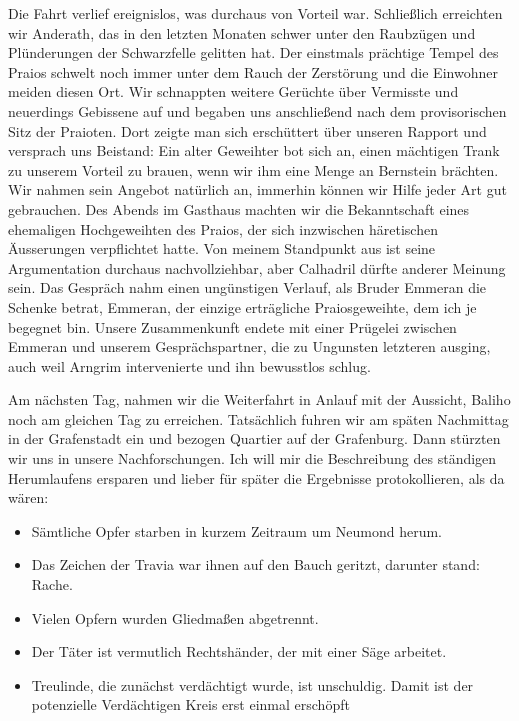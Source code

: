 Die Fahrt verlief ereignislos, was durchaus von Vorteil war. Schließlich erreichten wir Anderath, das in den letzten Monaten schwer unter den Raubzügen und Plünderungen der Schwarzfelle gelitten hat. Der einstmals prächtige Tempel des Praios schwelt noch immer unter dem Rauch der Zerstörung und die Einwohner meiden diesen Ort. Wir schnappten weitere Gerüchte über Vermisste und neuerdings Gebissene auf und begaben uns anschließend nach dem provisorischen Sitz der Praioten. Dort zeigte man sich erschüttert über unseren Rapport und versprach uns Beistand: Ein alter Geweihter bot sich an, einen mächtigen Trank zu unserem Vorteil zu brauen, wenn wir ihm eine Menge an Bernstein brächten. Wir nahmen sein Angebot natürlich an, immerhin können wir Hilfe jeder Art gut gebrauchen. Des Abends im Gasthaus machten wir die Bekanntschaft eines ehemaligen Hochgeweihten des Praios, der sich inzwischen häretischen Äusserungen verpflichtet hatte. Von meinem Standpunkt aus ist seine Argumentation durchaus nachvollziehbar, aber Calhadril dürfte anderer Meinung sein. Das Gespräch nahm einen ungünstigen Verlauf, als Bruder Emmeran die Schenke betrat, Emmeran, der einzige erträgliche Praiosgeweihte, dem ich je begegnet bin. Unsere Zusammenkunft endete mit einer Prügelei zwischen Emmeran und unserem Gesprächspartner, die zu Ungunsten letzteren ausging, auch weil Arngrim intervenierte und ihn bewusstlos schlug.\par

Am nächsten Tag, nahmen wir die Weiterfahrt in Anlauf mit der Aussicht, Baliho noch am gleichen Tag zu erreichen. Tatsächlich fuhren wir am späten Nachmittag in der Grafenstadt ein und bezogen Quartier auf der Grafenburg. Dann stürzten wir uns in unsere Nachforschungen. Ich will mir die Beschreibung des ständigen Herumlaufens ersparen und lieber für später die Ergebnisse protokollieren, als da wären:

\begin{itemize}
\item Sämtliche Opfer starben in kurzem Zeitraum um Neumond herum.
\item Das Zeichen der Travia war ihnen auf den Bauch geritzt, darunter stand: Rache.
\item Vielen Opfern wurden Gliedmaßen abgetrennt.
\item Der Täter ist vermutlich Rechtshänder, der mit einer Säge arbeitet.
\item Treulinde, die zunächst verdächtigt wurde, ist unschuldig. Damit ist der potenzielle Verdächtigen Kreis erst einmal erschöpft
\end{itemize}


